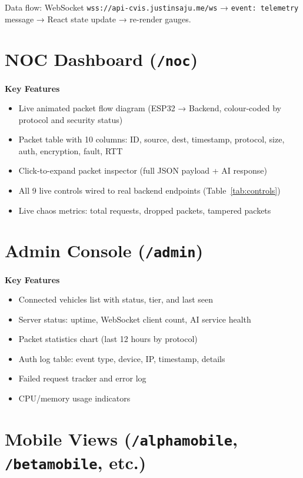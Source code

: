 \documentclass[12pt,a4paper]{report}
\newenvironment{ccnsbox}[1]{%
  \begin{mdframed}[backgroundcolor=cvislightbg,
    linecolor=cvisblue,linewidth=1.5pt,
    innerleftmargin=10pt,innerrightmargin=10pt,
    innertopmargin=6pt,innerbottommargin=6pt]
  \textbf{\color{cvisblue}#1}\par\smallskip}
  {\end{mdframed}}
\begin{document}
Data flow: WebSocket \texttt{wss://api-cvis.justinsaju.me/ws} → \texttt{event: telemetry} message → React state update → re-render gauges.

\section{NOC Dashboard (\texttt{/noc})}

\begin{ccnsbox}{Key Features}
\begin{itemize}[nosep]
  \item Live animated packet flow diagram (ESP32 → Backend, colour-coded by protocol and security status)
  \item Packet table with 10 columns: ID, source, dest, timestamp, protocol, size, auth, encryption, fault, RTT
  \item Click-to-expand packet inspector (full JSON payload + AI response)
  \item All 9 live controls wired to real backend endpoints (Table~\ref{tab:controls})
  \item Live chaos metrics: total requests, dropped packets, tampered packets
\end{itemize}
\end{ccnsbox}

\section{Admin Console (\texttt{/admin})}

\begin{ccnsbox}{Key Features}
\begin{itemize}[nosep]
  \item Connected vehicles list with status, tier, and last seen
  \item Server status: uptime, WebSocket client count, AI service health
  \item Packet statistics chart (last 12 hours by protocol)
  \item Auth log table: event type, device, IP, timestamp, details
  \item Failed request tracker and error log
  \item CPU/memory usage indicators
\end{itemize}
\end{ccnsbox}

\section{Mobile Views (\texttt{/alphamobile}, \texttt{/betamobile}, etc.)}
\end{document}
